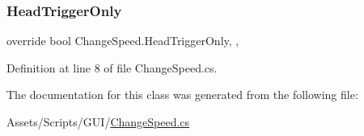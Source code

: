 \subsubsection{\texorpdfstring{Head\+Trigger\+Only}{HeadTriggerOnly}}
{\footnotesize\ttfamily override bool Change\+Speed.\+Head\+Trigger\+Only\hspace{0.3cm}{\ttfamily [get]}, {\ttfamily [set]}, {\ttfamily [protected]}}



Definition at line 8 of file Change\+Speed.\+cs.



The documentation for this class was generated from the following file\+:\begin{DoxyCompactItemize}
\item 
Assets/\+Scripts/\+G\+U\+I/\mbox{\hyperlink{_change_speed_8cs}{Change\+Speed.\+cs}}\end{DoxyCompactItemize}

